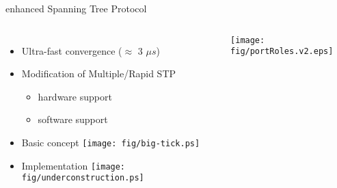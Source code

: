 \documentclass[compress,red]{beamer}
\begin{document}
\begin{frame}{enhanced Spanning Tree Protocol}

\begin{columns}[c]

  \begin{itemize}
    \item Ultra-fast convergence ($\approx$ 3 $\mu s$)
    \item Modification of Multiple/Rapid STP 
    \begin{itemize}
      \item hardware support
      \item software support
     \end{itemize}
    \item Basic concept  \texttt{[image: fig/big-tick.ps]}
    \item Implementation \texttt{[image: fig/underconstruction.ps]}
  \end{itemize}


      \begin{center}
	\texttt{[image: fig/portRoles.v2.eps]}
      \end{center}

 \end{columns}

\end{frame}
\end{document}
